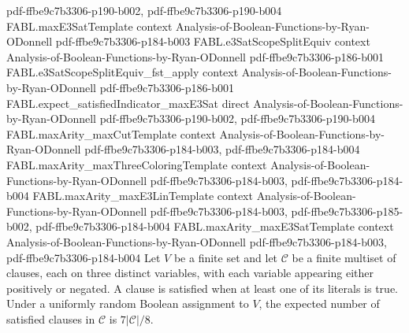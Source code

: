 \begin{theorem}
  {pdf-ffbe9c7b3306-p190-b002,
    pdf-ffbe9c7b3306-p190-b004}
\proofstep
  {FABL.maxE3SatTemplate}
  {context}
  {Analysis-of-Boolean-Functions-by-Ryan-ODonnell}
  {pdf-ffbe9c7b3306-p184-b003}
\proofstep
  {FABL.e3SatScopeSplitEquiv}
  {context}
  {Analysis-of-Boolean-Functions-by-Ryan-ODonnell}
  {pdf-ffbe9c7b3306-p186-b001}
\proofstep
  {FABL.e3SatScopeSplitEquiv_fst_apply}
  {context}
  {Analysis-of-Boolean-Functions-by-Ryan-ODonnell}
  {pdf-ffbe9c7b3306-p186-b001}
\proofstep
  {FABL.expect_satisfiedIndicator_maxE3Sat}
  {direct}
  {Analysis-of-Boolean-Functions-by-Ryan-ODonnell}
  {pdf-ffbe9c7b3306-p190-b002,
    pdf-ffbe9c7b3306-p190-b004}
\proofstep
  {FABL.maxArity_maxCutTemplate}
  {context}
  {Analysis-of-Boolean-Functions-by-Ryan-ODonnell}
  {pdf-ffbe9c7b3306-p184-b003,
    pdf-ffbe9c7b3306-p184-b004}
\proofstep
  {FABL.maxArity_maxThreeColoringTemplate}
  {context}
  {Analysis-of-Boolean-Functions-by-Ryan-ODonnell}
  {pdf-ffbe9c7b3306-p184-b003,
    pdf-ffbe9c7b3306-p184-b004}
\proofstep
  {FABL.maxArity_maxE3LinTemplate}
  {context}
  {Analysis-of-Boolean-Functions-by-Ryan-ODonnell}
  {pdf-ffbe9c7b3306-p184-b003,
    pdf-ffbe9c7b3306-p185-b002,
    pdf-ffbe9c7b3306-p184-b004}
\proofstep
  {FABL.maxArity_maxE3SatTemplate}
  {context}
  {Analysis-of-Boolean-Functions-by-Ryan-ODonnell}
  {pdf-ffbe9c7b3306-p184-b003,
    pdf-ffbe9c7b3306-p184-b004}
Let $V$ be a finite set and let $\mathcal{C}$ be a finite multiset of clauses, each on
three distinct variables, with each variable appearing either positively or negated. A
clause is satisfied when at least one of its literals is true. Under a uniformly random
Boolean assignment to $V$, the expected number of satisfied clauses in $\mathcal{C}$ is
$7|\mathcal{C}|/8$.
\end{theorem}

